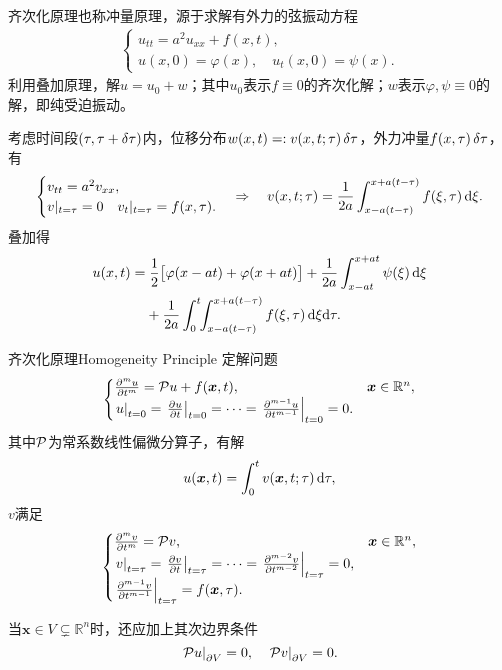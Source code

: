 齐次化原理也称冲量原理，源于求解有外力的弦振动方程
\begin{align*}
	\begin{cases}
		u_{tt}=a^2u_{xx}+f(x,t),\\
		u(x,0)=\varphi(x),\quad u_t(x,0)=\psi(x).
	\end{cases}
\end{align*}
利用叠加原理，解$u=u_0+w$；其中$u_0$表示$f\equiv 0$的齐次化解；$w$表示$\varphi,\psi\equiv 0$的解，即纯受迫振动。

考虑时间段$(\tau,\tau+\vd\tau)$内，位移分布$w(x,t)=:v(x,t;\tau)\vd\tau$，外力冲量$f(x,\tau)\vd\tau$，有
\begin{align*}
	\begin{cases}
			v_{tt}=a^2v_{xx},\\
			v|_{t=\tau}=0\quad v_t|_{t=\tau}=f(x,\tau).
	\end{cases}\Rightarrow\quad v(x,t;\tau)=\frac1{2a}\int_{x-a(t-\tau)}^{x+a(t-\tau)}f(\xi,\tau)\d\xi.
\end{align*}
叠加得
\begin{align}
	\begin{aligned}
		u(x,t)= &\;\frac12\bigfkh{\varphi(x-at)+\varphi(x+at)}+\frac1{2a}\int_{x-at}^{x+at}\psi(\xi)\d\xi \\
		        & +\frac1{2a}\int_0^t\bs3\int_{x-a(t-\tau)}^{x+a(t-\tau)}f(\xi,\tau)\d\xi\nd\tau.
	\end{aligned}
\end{align}
\begin{theorem}{齐次化原理}{Homogeneity Principle}
	定解问题
	\begin{align*}
		\begin{cases}
			\frac{\p^mu}{\p t^m}=\Par u+f(\bm x,t),&\bm x\in\mathbb R^n,\\
			\edg u_{t=0}=\edg{\pv ut}_{t=0}=\cdots=\edg{\frac{\p^{m-1}u}{\p t^{m-1}}}_{t=0}=0.
		\end{cases}
	\end{align*}
	其中$\Par$为常系数线性偏微分算子，有解
	\[
		u(\bm x,t)=\int_0^tv(\bm x,t;\tau)\d\tau,
	\]
	$v$满足
	\begin{align*}
		\begin{cases}
			\pu mvt=\Par v,&\bm x\in\mathbb R^n,\\
			\edg v_{t=\tau}=\edg{\pv v{t}}_{t=\tau}=\cdots=\edg{\pu{m-2}vt}_{t=\tau}=0, \\
			\edg{\pu{m-1}vt}_{t=\tau}=f(\bm x,\tau).
		\end{cases}
	\end{align*}

	当$\bm x\in V\subsetneq\mathbb R^n$时，还应加上其次边界条件
	\[
		\edg{\Par u}_{\p V}=0,\quad\edg{\Par v}_{\p V}=0.
	\]
\end{theorem}
\clearpage
